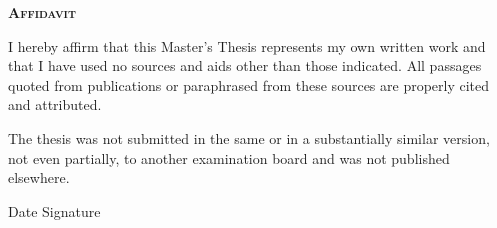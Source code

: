 %
%
%
% 
% 

{\Large\textbf{\textsc{Affidavit}}}

\vspace{0.65cm}

I hereby affirm that this Master’s Thesis represents my own written work and that I have used no sources and aids other than those indicated. All passages quoted from publications or paraphrased from these sources are properly cited and attributed.

The thesis was not submitted in the same or in a substantially similar version, not even partially, to another examination board and was not published elsewhere.

\vspace{2.0cm}
\noindent\makebox[\linewidth]{\rule{7cm}{0.4pt}  \hspace{1.0cm} {\rule{7cm}{0.4pt}}}

\hspace{3.0cm} Date \hspace{7.0cm} Signature
